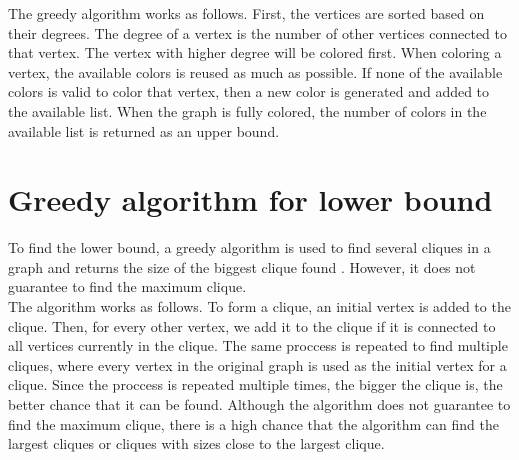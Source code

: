 \documentclass[a4paper]{report}
\begin{document}
		The greedy algorithm works as follows. First, the vertices are sorted based on their degrees. The degree of a vertex is the number of other vertices connected to that vertex. The vertex with higher degree will be colored first. When coloring a vertex, the available colors is reused as much as possible. If none of the available colors is valid to color that vertex, then a new color is generated and added to the available list. When the graph is fully colored, the number of colors in the available list is returned as an upper bound.\\
		
		\section{Greedy algorithm for lower bound}
		To find the lower bound, a greedy algorithm is used to find several cliques in a graph and returns the size of the biggest clique found \cite{steven2008algorithm}. However, it does not guarantee to find the maximum clique. \\
		
		The algorithm works as follows. To form a clique, an initial vertex is added to the clique. Then, for every other vertex, we add it to the clique if it is connected to all vertices currently in the clique. The same proccess is repeated to find multiple cliques, where every vertex in the original graph is used as the initial vertex for a clique. Since the proccess is repeated multiple times, the bigger the clique is, the better chance that it can be found. Although the algorithm does not guarantee to find the maximum clique, there is a high chance that the algorithm can find the largest cliques or cliques with sizes close to the largest clique. 
\end{document}
